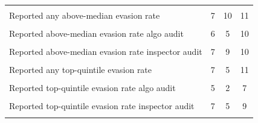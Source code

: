 {\begin{tabular}{l*{3}{c}}
            &                     &                     &                     \\
Reported any above-median evasion rate&           7         &          10         &          11         \\
            &                     &                     &                     \\
Reported above-median evasion rate algo audit&           6         &           5         &          10         \\
            &                     &                     &                     \\
Reported above-median evasion rate inspector audit&           7         &           9         &          10         \\
            &                     &                     &                     \\
Reported any top-quintile evasion rate&           7         &           5         &          11         \\
            &                     &                     &                     \\
Reported top-quintile  evasion rate algo audit&           5         &           2         &           7         \\
            &                     &                     &                     \\
Reported top-quintile  evasion rate  inspector audit&           7         &           5         &           9         \\
            &                     &                     &                     \\
\bottomrule
\end{tabular}
}

